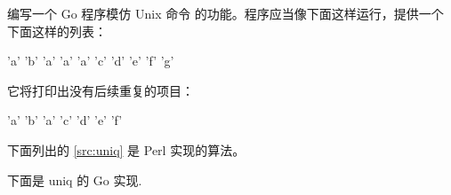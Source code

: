 \begin{Exercise}[title={Uniq},difficulty=4]
\label{ex:Uniq}
\Question\label{ex:Uniq q1} 编写一个 Go 程序模仿 Unix 命令 
 的功能。程序应当像下面这样运行，提供一个下面这样的列表：

\begin{display}
'a' 'b' 'a' 'a' 'a' 'c' 'd' 'e' 'f' 'g'
\end{display}

它将打印出没有后续重复的项目：

\begin{display}
'a' 'b' 'a' 'c' 'd' 'e' 'f'
\end{display}
\exdisfix
下面列出的 \ref{src:uniq} 是 Perl 实现的算法。


\end{Exercise}

\begin{Answer}
\Question 下面是 uniq 的 Go 实现.

\end{Answer}
